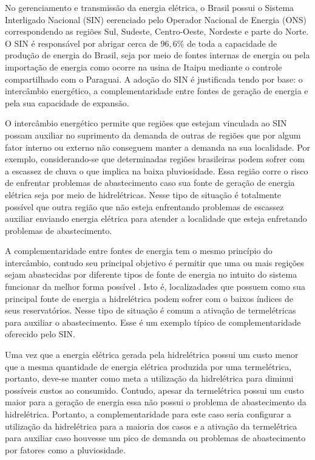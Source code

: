 No gerenciamento e transmiss\~ao da energia el\'etrica, o Brasil possui o Sistema Interligado Nacional (SIN)
eerenciado pelo Operador Nacional de Energia (ONS)
 correspondendo as regi\~oes Sul, Sudeste, Centro-Oeste, Nordeste e parte do Norte. O SIN \'e respons\'avel por abrigar cerca de
$96,6\%$ de toda a capacidade de produ\c c\~ao de energia do Brasil, seja por meio de fontes internas de energia
ou pela importa\c c\~ao de energia como ocorre na usina de Itaipu mediante o controle compartilhado com o
Paraguai\cite{an}. A ado\c c\~ao do SIN \'e justificada tendo por base: o interc\^ambio energ\'etico, a
complementaridade entre fontes de gera\c c\~ao de energia e pela sua capacidade de expans\~ao.

O interc\^ambio energ\'etico permite que regi\~oes que estejam vinculada ao SIN possam auxiliar no suprimento da
demanda de outras de regi\~oes que por algum fator interno ou externo n\~ao conseguem manter a demanda na sua localidade\cite{an}. Por
exemplo, considerando-se que determinadas regi\~oes brasileiras podem sofrer com a escassez de chuva o que implica na
baixa pluviosidade. Essa regi\~ao corre o risco de enfrentar problemas de abastecimento caso sua fonte de gera\c c\~ao
de energia el\'etrica seja por meio de hidrel\'etricas. Nesse tipo de situa\c c\~ao \'e totalmente poss\'ivel que outra
regi\~ao que n\~ao esteja enfrentando problemas de escassez auxiliar enviando energia el\'etrica para atender a
localidade que esteja enfretando problemas de abastecimento. 

A complementaridade entre fontes de energia tem o mesmo princ\'ipio do interc\^ambio, contudo seu principal objetivo \'e permitir
que uma ou mais regi\c c\~oes sejam abastecidas por diferente tipos de fonte de energia no intuito do sistema funcionar
da melhor forma poss\'ivel \cite{an}. Isto \'e, localizadades que possuem como sua principal fonte de energia a
hidrel\'etrica podem sofrer com o baixos \'indices de seus reservat\'orios. Nesse tipo de situa\c c\~ao
\'e comum a ativa\c c\~ao de termel\'etricas para auxiliar o abastecimento. Esse \'e um exemplo t\'ipico de
complementaridade oferecido pelo SIN. 

Uma vez que a energia el\'etrica gerada pela hidrel\'etrica possui um custo menor
que a mesma quantidade de energia el\'etrica produzida por uma termel\'etrica, portanto, deve-se manter como meta a utiliza\c c\~ao
da hidrel\'etrica para diminui poss\'iveis custos ao consumido\cite{an}. Contudo, apesar da termel\'etrica possui um
custo maior para a gera\c c\~ao de energia essa n\~ao possui o problema de abastecimento da hidrel\'etrica.
Portanto, a complementaridade para este caso seria configurar a utiliza\c c\~ao da hidrel\'etrica para a maioria dos
casos e a ativa\c c\~ao da termel\'etrica para auxiliar caso houvesse um pico de demanda ou problemas de
abastecimento por fatores como a pluviosidade.  

